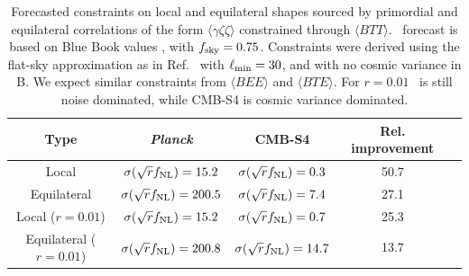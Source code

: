 \begin{table}[t]
  \begin{center}
    \begin{tabular}{ | c || c | c | c | c |}
      \hline
      Type & {\it Planck} & CMB-S4 & Rel. improvement  \\ \hline \hline
      Local & $\sigma(\sqrt{r}f_{\rm NL}) = 15.2$ & $\sigma(\sqrt{r}f_{\rm NL}) = 0.3$ & 50.7\\ \hline 
      Equilateral &  $\sigma(\sqrt{r}f_{\rm NL}) = 200.5$ & $\sigma(\sqrt{r}f_{\rm NL}) = 7.4$ & 27.1\\ \hline 
      Local ($r = 0.01$) & $\sigma(\sqrt{r}f_{\rm NL}) = 15.2$ & $\sigma(\sqrt{r}f_{\rm NL}) = 0.7$ & 25.3\\ \hline 
      Equilateral ($r = 0.01$) &  $\sigma(\sqrt{r}f_{\rm NL}) = 200.8$ & $\sigma(\sqrt{r}f_{\rm NL}) = 14.7$ & 13.7\\ \hline 
    \end{tabular}
  \end{center}
  \caption{Forecasted constraints on local and equilateral shapes sourced by primordial and equilateral correlations of the form $\langle \gamma \zeta\zeta \rangle$ constrained through $\langle BTT \rangle$. \planck\ forecast is based on Blue Book values \cite{Planck:2006aa}, with $f_{\rm sky} = 0.75$. Constraints were derived using the flat-sky approximation as in Ref.~\cite{Meerburg:2016ecv} with $\ell_{\rm min} = 30$, and with no cosmic variance in B.  We expect similar constraints from $\langle BEE \rangle$ and $\langle BTE \rangle$. For $r = 0.01$ \planck\ is still noise dominated, while CMB-S4 is cosmic variance dominated. }
\label{tab:fnl_forecast2}
\end{table}



